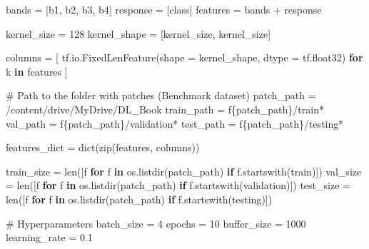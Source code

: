\documentclass[
  letterpaper,
  DIV=11,
  numbers=noendperiod]{scrreprt}
\newenvironment{Shaded}{\begin{snugshade}}{\end{snugshade}}
\newcommand{\BuiltInTok}[1]{\textcolor[rgb]{0.00,0.23,0.31}{#1}}
\newcommand{\CommentTok}[1]{\textcolor[rgb]{0.37,0.37,0.37}{#1}}
\newcommand{\ControlFlowTok}[1]{\textcolor[rgb]{0.00,0.23,0.31}{\textbf{#1}}}
\newcommand{\DecValTok}[1]{\textcolor[rgb]{0.68,0.00,0.00}{#1}}
\newcommand{\FloatTok}[1]{\textcolor[rgb]{0.68,0.00,0.00}{#1}}
\newcommand{\KeywordTok}[1]{\textcolor[rgb]{0.00,0.23,0.31}{\textbf{#1}}}
\newcommand{\NormalTok}[1]{\textcolor[rgb]{0.00,0.23,0.31}{#1}}
\newcommand{\OperatorTok}[1]{\textcolor[rgb]{0.37,0.37,0.37}{#1}}
\newcommand{\SpecialCharTok}[1]{\textcolor[rgb]{0.37,0.37,0.37}{#1}}
\newcommand{\SpecialStringTok}[1]{\textcolor[rgb]{0.13,0.47,0.30}{#1}}
\newcommand{\StringTok}[1]{\textcolor[rgb]{0.13,0.47,0.30}{#1}}
\begin{document}
\begin{Shaded}
\begin{Highlighting}[]
\NormalTok{bands }\OperatorTok{=}\NormalTok{ [}\StringTok{\textquotesingle{}b1\textquotesingle{}}\NormalTok{, }\StringTok{\textquotesingle{}b2\textquotesingle{}}\NormalTok{, }\StringTok{\textquotesingle{}b3\textquotesingle{}}\NormalTok{, }\StringTok{\textquotesingle{}b4\textquotesingle{}}\NormalTok{]}
\NormalTok{response }\OperatorTok{=}\NormalTok{ [}\StringTok{\textquotesingle{}class\textquotesingle{}}\NormalTok{]}
\NormalTok{features }\OperatorTok{=}\NormalTok{ bands }\OperatorTok{+}\NormalTok{ response}

\NormalTok{kernel\_size }\OperatorTok{=} \DecValTok{128}
\NormalTok{kernel\_shape }\OperatorTok{=}\NormalTok{ [kernel\_size, kernel\_size]}

\NormalTok{columns }\OperatorTok{=}\NormalTok{ [}
\NormalTok{  tf.io.FixedLenFeature(shape }\OperatorTok{=}\NormalTok{ kernel\_shape, dtype }\OperatorTok{=}\NormalTok{ tf.float32) }\ControlFlowTok{for}\NormalTok{ k }\KeywordTok{in}\NormalTok{ features}
\NormalTok{]}

\CommentTok{\# Path to the folder with patches (Benchmark dataset)}
\NormalTok{patch\_path }\OperatorTok{=} \StringTok{\textquotesingle{}/content/drive/MyDrive/DL\_Book\textquotesingle{}}
\NormalTok{train\_path }\OperatorTok{=} \SpecialStringTok{f\textquotesingle{}}\SpecialCharTok{\{}\NormalTok{patch\_path}\SpecialCharTok{\}}\SpecialStringTok{/train*\textquotesingle{}}
\NormalTok{val\_path   }\OperatorTok{=} \SpecialStringTok{f\textquotesingle{}}\SpecialCharTok{\{}\NormalTok{patch\_path}\SpecialCharTok{\}}\SpecialStringTok{/validation*\textquotesingle{}}
\NormalTok{test\_path  }\OperatorTok{=} \SpecialStringTok{f\textquotesingle{}}\SpecialCharTok{\{}\NormalTok{patch\_path}\SpecialCharTok{\}}\SpecialStringTok{/testing*\textquotesingle{}}

\NormalTok{features\_dict }\OperatorTok{=} \BuiltInTok{dict}\NormalTok{(}\BuiltInTok{zip}\NormalTok{(features, columns))}

\NormalTok{train\_size }\OperatorTok{=} \BuiltInTok{len}\NormalTok{([f }\ControlFlowTok{for}\NormalTok{ f }\KeywordTok{in}\NormalTok{ os.listdir(patch\_path) }\ControlFlowTok{if}\NormalTok{ f.startswith(}\StringTok{\textquotesingle{}train\textquotesingle{}}\NormalTok{)])}
\NormalTok{val\_size }\OperatorTok{=} \BuiltInTok{len}\NormalTok{([f }\ControlFlowTok{for}\NormalTok{ f }\KeywordTok{in}\NormalTok{ os.listdir(patch\_path) }\ControlFlowTok{if}\NormalTok{ f.startswith(}\StringTok{\textquotesingle{}validation\textquotesingle{}}\NormalTok{)])}
\NormalTok{test\_size }\OperatorTok{=} \BuiltInTok{len}\NormalTok{([f }\ControlFlowTok{for}\NormalTok{ f }\KeywordTok{in}\NormalTok{ os.listdir(patch\_path) }\ControlFlowTok{if}\NormalTok{ f.startswith(}\StringTok{\textquotesingle{}testing\textquotesingle{}}\NormalTok{)])}

\CommentTok{\# Hyperparameters}
\NormalTok{batch\_size }\OperatorTok{=} \DecValTok{4}
\NormalTok{epochs }\OperatorTok{=} \DecValTok{10}
\NormalTok{buffer\_size }\OperatorTok{=} \DecValTok{1000}
\NormalTok{learning\_rate }\OperatorTok{=} \FloatTok{0.1}
\end{Highlighting}
\end{Shaded}
\end{document}
